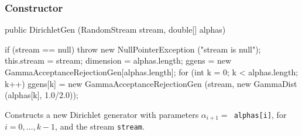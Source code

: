 \subsubsection* {Constructor}
\begin{code}

   public DirichletGen (RandomStream stream, double[] alphas)\begin{hide} {
      if (stream == null)
         throw new NullPointerException ("stream is null");
      this.stream = stream;
      dimension = alphas.length;
      ggens = new GammaAcceptanceRejectionGen[alphas.length];
      for (int k = 0; k < alphas.length; k++)
         ggens[k] = new GammaAcceptanceRejectionGen
            (stream, new GammaDist (alphas[k], 1.0/2.0));
   }\end{hide}
\end{code}
\begin{tabb}   Constructs a new Dirichlet
 generator with parameters $\alpha_{i+1}=$~\texttt{alphas[i]},
 for $i=0,\ldots,k-1$, and the stream \texttt{stream}.
\end{tabb}
\begin{htmlonly}
\end{htmlonly}

%
